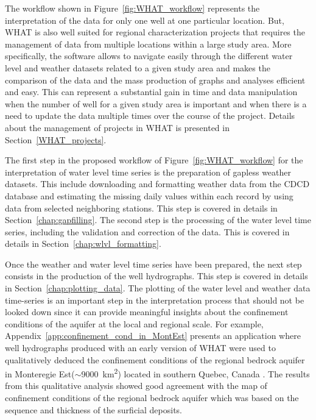 \documentclass[WHATMANUAL.tex]{subfiles}
\begin{document}
The workflow shown in Figure~\ref{fig:WHAT_workflow} represents the interpretation of the data for only one well at one particular location. But, WHAT is also well suited for regional characterization projects that requires the management of data from multiple locations within a large study area. More specifically, the software allows to navigate easily through the different water level and weather datasets related to a given study area and makes the comparison of the data and the mass production of graphs and analyses efficient and easy. This can represent a substantial gain in time and data manipulation when the number of well for a given study area is important and when there is a need to update the data multiple times over the course of the project. Details about the management of projects in WHAT is presented in Section~\ref{WHAT_projects}.

The first step in the proposed workflow of Figure~\ref{fig:WHAT_workflow} for the interpretation of water level time series is the preparation of gapless weather datasets. This include downloading and formatting weather data from the CDCD database and estimating the missing daily values within each record by using data from selected neighboring stations. This step is covered in details in Section~\ref{chap:gapfilling}. The second step is the processing of the water level time series, including the validation and correction of the data. This is covered in details in Section~\ref{chap:wlvl_formatting}.

Once the weather and water level time series have been prepared, the next step consists in the production of the well hydrographs. This step is covered in details in Section~\ref{chap:plotting_data}. The plotting of the water level and weather data time-series is an important step in the interpretation process that should not be looked down since it can provide meaningful insights about the confinement conditions of the aquifer at the local and regional scale. For example, Appendix~\ref{app:confinement_cond_in_MontEst} presents an application where well hydrographs produced with an early version of WHAT were used to qualitatively deduced the confinement conditions of the regional bedrock aquifer in Monteregie Est($\sim$9000~km\textsuperscript{2}) located in southern Quebec, Canada \citep{carrier_portrait_2013}. The results from this qualitative analysis showed good agreement with the map of confinement conditions of the regional bedrock aquifer which was based on the sequence and thickness of the surficial deposits. 
\end{document}
